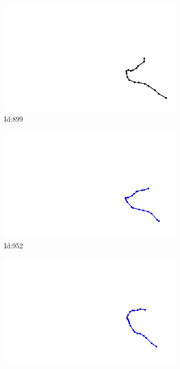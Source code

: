 \documentclass[12pt,twoside]{report}
\begin{document}
\begin{figure}
\begin{subfigure}[b]{0.20\textwidth}
\centering
\includegraphics[width=\textwidth]{../trajectories/899.png}
\caption{Id:899}
\end{subfigure}
\begin{subfigure}[b]{0.20\textwidth}
\centering
\includegraphics[width=\textwidth]{../trajectories/952.png}
\caption{Id:952}
\end{subfigure}
\begin{subfigure}[b]{0.20\textwidth}
\centering
\includegraphics[width=\textwidth]{../trajectories/966.png}

\end{subfigure}
\end{figure}
\end{document}
